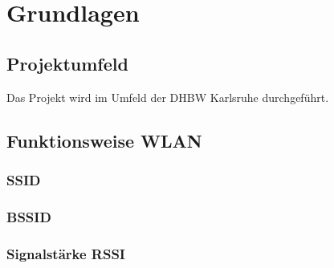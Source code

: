 \chapter{Grundlagen}

\section{Projektumfeld}

Das Projekt wird im Umfeld der \gls{DHBW} Karlsruhe durchgeführt.

\section{Funktionsweise WLAN}

\subsection{SSID}

\subsection{BSSID}

\subsection{Signalstärke RSSI}

